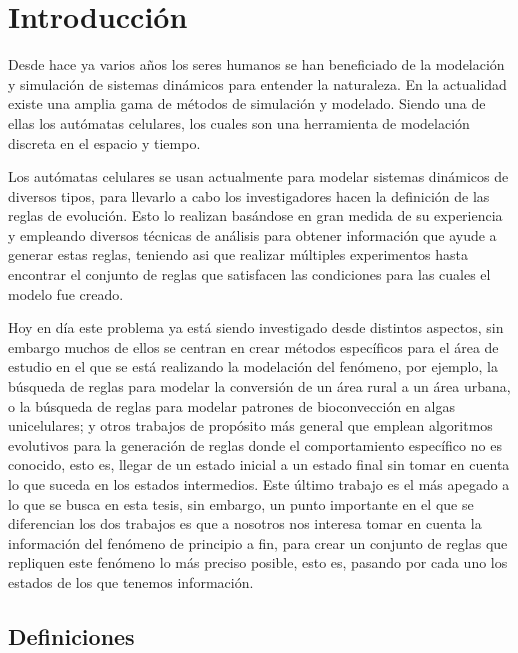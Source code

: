 \pagebreak  %
\cleardoublepage
\pagestyle{headings}

\chapter{Introducción}
%
Desde hace ya varios años los seres humanos se han beneficiado de la modelación y simulación de sistemas dinámicos para entender la naturaleza. En la actualidad existe una amplia gama de métodos de simulación y modelado. Siendo una de ellas los autómatas celulares, los cuales son una herramienta de modelación discreta en el espacio y tiempo. 

Los autómatas celulares se usan actualmente para modelar sistemas dinámicos de diversos tipos, para llevarlo a cabo los investigadores hacen la definición de las reglas de evolución. Esto lo realizan basándose en gran medida de su experiencia y empleando diversos técnicas de análisis para obtener información que ayude a generar estas reglas, teniendo asi que realizar múltiples experimentos hasta encontrar el conjunto de reglas que satisfacen las condiciones para las cuales el modelo fue creado.

Hoy en día este problema ya está siendo investigado desde distintos aspectos, sin embargo muchos de ellos se centran en crear métodos específicos para el área de estudio en el que se está realizando la modelación del fenómeno, por ejemplo, la búsqueda de reglas para modelar la conversión de un área rural a un área urbana, o la búsqueda de reglas para modelar patrones de bioconvección en algas unicelulares; y otros trabajos de propósito más general que emplean algoritmos evolutivos para la generación de reglas donde el comportamiento específico no es conocido, esto es, llegar de un estado inicial a un estado final sin tomar en cuenta lo que suceda en los estados intermedios.
Este último trabajo es el más apegado a lo que se busca en esta tesis, sin embargo, un punto importante en el que se diferencian los dos trabajos es que a nosotros nos interesa tomar en cuenta la información del fenómeno de principio a fin, para crear un conjunto de reglas que repliquen este fenómeno lo más preciso posible, esto es, pasando por cada uno los estados de los que tenemos información.

\section{Definiciones}

